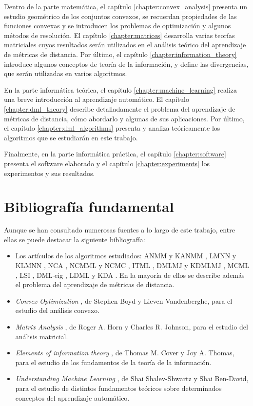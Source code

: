 Dentro de la parte matemática, el capítulo \ref{chapter:convex_analysis} presenta un estudio geométrico de los conjuntos convexos, se recuerdan propiedades de las funciones convexas y se introducen los problemas de optimización y algunos métodos de resolución. El capítulo \ref{chapter:matrices} desarrolla varias teorías matriciales cuyos resultados serán utilizados en el análisis teórico del aprendizaje de métricas de distancia. Por último, el capítulo \ref{chapter:information_theory} introduce algunos conceptos de teoría de la información, y define las divergencias, que serán utilizadas en varios algoritmos.

En la parte informática teórica, el capítulo \ref{chapter:machine_learning} realiza una breve introducción al aprendizaje automático. El capítulo \ref{chapter:dml_theory} describe detalladamente el problema del aprendizaje de métricas de distancia, cómo abordarlo y algunas de sus aplicaciones. Por último, el capítulo \ref{chapter:dml_algorithms} presenta y analiza teóricamente los algoritmos que se estudiarán en este trabajo.

Finalmente, en la parte informática práctica, el capítulo \ref{chapter:software} presenta el software elaborado y el capítulo \ref{chapter:experiments} los experimentos y sus resultados.

\section{Bibliografía fundamental}

Aunque se han consultado numerosas fuentes a lo largo de este trabajo, entre ellas se puede destacar la siguiente bibliografía:
\begin{itemize}
    \item Los artículos de los algoritmos estudiados: ANMM y KANMM \cite{anmm}, LMNN y KLMNN \cite{lmnn}, NCA \cite{nca}, NCMML y NCMC \cite{ncmml}, ITML \cite{itml}, DMLMJ y KDMLMJ \cite{dmlmj}, MCML \cite{mcml}, LSI \cite{lsi}, DML-eig \cite{dmleig}, LDML \cite{ldml} y KDA \cite{kda}. En la mayoría de ellos se describe además el problema del aprendizaje de métricas de distancia.
    \item \emph{Convex Optimization} \cite{convexoptimization}, de Stephen Boyd y Lieven Vandenberghe, para el estudio del análisis convexo.
    \item \emph{Matrix Analysis} \cite{matrix_analysis}, de Roger A. Horn y Charles R. Johnson, para el estudio del análisis matricial.
    \item \emph{Elements of information theory} \cite{information_theory}, de Thomas M. Cover y Joy A. Thomas, para el estudio de los fundamentos de la teoría de la información.
    \item \emph{Understanding Machine Learning} \cite{understandingml}, de Shai Shalev-Shwartz y Shai Ben-David, para el estudio de distintos fundamentos teóricos sobre determinados conceptos del aprendizaje automático.
\end{itemize}

